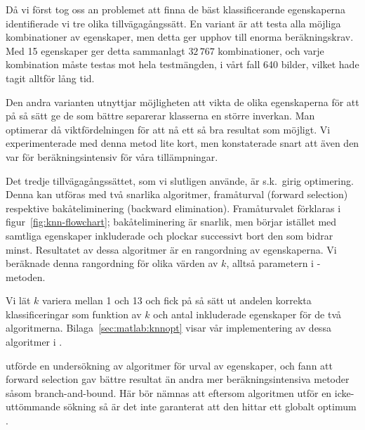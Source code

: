 \documentclass[../rapport_MVEX01-11-05]{subfiles}
\begin{document}
Då vi först tog oss an problemet att finna de bäst klassificerande
egenskaperna identifierade vi tre olika tillvägagångssätt. En variant är att
testa alla möjliga kombinationer av egenskaper,
men detta ger upphov till enorma beräkningskrav. Med 15
egenskaper ger detta sammanlagt $32\,767$ kombinationer, och varje kombination
måste testas mot hela testmängden, i vårt fall 640 bilder, vilket hade tagit
alltför lång tid.
 
Den andra varianten utnyttjar
möjligheten att vikta de olika egenskaperna för att på så sätt ge de som bättre
separerar klasserna en
större inverkan. Man optimerar då
viktfördelningen för att nå ett så bra resultat som möjligt. Vi experimenterade
med denna metod lite kort, men konstaterade snart att även den var för 
beräkningsintensiv för våra tillämpningar.

Det tredje tillvägagångssättet, som vi slutligen 
använde, är s.k.~girig optimering. Denna kan utföras med två snarlika
algoritmer, framåturval (forward selection) respektive
bakåteliminering (backward elimination).
Framåturvalet förklaras 
i figur~\vref{fig:knn-flowchart}; bakåteliminering är snarlik, men börjar 
istället med samtliga egenskaper inkluderade och plockar successivt bort den 
som bidrar minst.
Resultatet av dessa algoritmer är en rangordning av egenskaperna.
Vi beräknade denna rangordning för olika värden
av $k$, alltså parametern i \knn-metoden.

Vi lät $k$ variera mellan 1 och 13 och fick på så sätt ut andelen
korrekta klassificeringar som funktion av $k$ och antal inkluderade egenskaper
för de två algoritmerna. Bilaga~\ref{sec:matlab:knnopt} visar vår
implementering av dessa algoritmer i \MATLAB.

 utförde en undersökning av algoritmer för urval av egenskaper,
och fann att forward selection gav bättre resultat än andra mer beräkningsintensiva
metoder såsom branch-and-bound.
Här bör nämnas att eftersom algoritmen utför en icke-uttömmande sökning så är
det inte garanterat att den hittar ett globalt optimum \cite{Cover77}.
\end{document}
